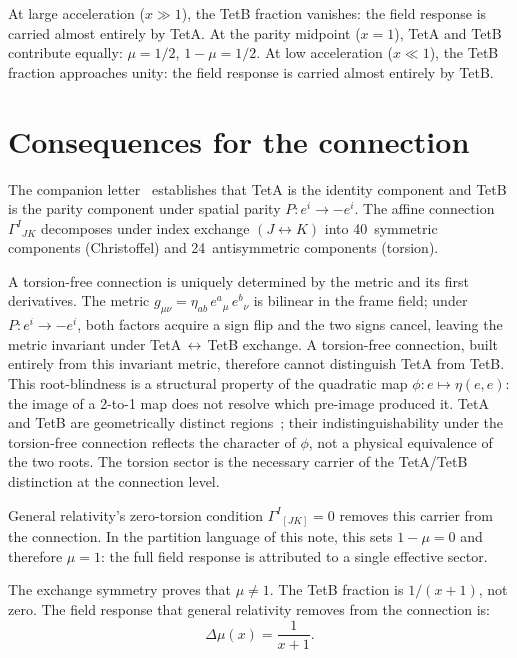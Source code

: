 \documentclass[twocolumn]{iopjournal}
\begin{document}
At large acceleration ($x \gg 1$), the TetB fraction
vanishes: the field response is carried almost entirely by
TetA. At the parity midpoint ($x = 1$), TetA and TetB
contribute equally: $\mu = 1/2$, $1 - \mu = 1/2$. At low
acceleration ($x \ll 1$), the TetB fraction approaches
unity: the field response is carried almost entirely by TetB.


\section*{Consequences for the connection}

The companion letter~\cite{Nelson2026a} establishes that
TetA is the identity component and TetB is the parity
component under spatial parity $P: e^i \to -e^i$. The
affine connection $\Gamma^I{}_{JK}$ decomposes under index
exchange $(J \leftrightarrow K)$ into 40~symmetric components
(Christoffel) and 24~antisymmetric components (torsion).

A torsion-free connection is uniquely determined by the metric
and its first derivatives. The metric
$g_{\mu\nu} = \eta_{ab}\,e^a{}_\mu\,e^b{}_\nu$ is bilinear
in the frame field; under $P: e^i \to -e^i$, both factors
acquire a sign flip and the two signs cancel, leaving the
metric invariant under TetA$\,\leftrightarrow\,$TetB exchange.
A torsion-free connection, built entirely from this invariant
metric, therefore cannot distinguish TetA from TetB. This
root-blindness is a structural property of the quadratic map
$\phi: e \mapsto \eta(e,e)$: the image of a 2-to-1 map does
not resolve which pre-image produced it. TetA and TetB are
geometrically distinct regions~\cite{Nelson2026a}; their
indistinguishability under the torsion-free connection reflects
the character of $\phi$, not a physical equivalence of the two
roots. The
torsion sector is the necessary carrier of the TetA/TetB
distinction at the connection level.

General relativity's zero-torsion condition
$\Gamma^I{}_{[JK]} = 0$ removes this carrier from the
connection. In the partition language of this note,
this sets $1 - \mu = 0$ and therefore $\mu = 1$: the full
field response is attributed to a single effective sector.

The exchange symmetry proves that $\mu \neq 1$. The TetB
fraction is $1/(x+1)$, not zero. The field response that
general relativity removes from the connection is:
\begin{equation}
  \Delta\mu(x) = \frac{1}{x + 1}.
  \label{eq:delta_mu}
\end{equation}
\end{document}
